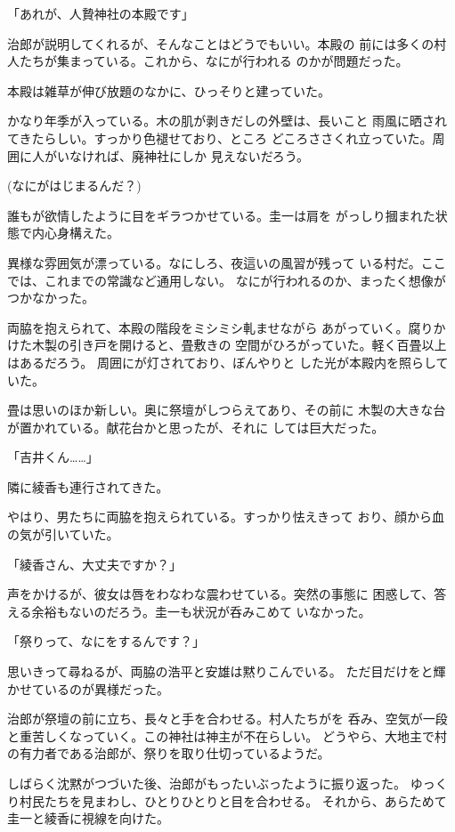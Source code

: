 ﻿\documentclass[
    book,tate,
    line_length=30zw,
    jafontsize=12pt,
    paper=b5j,
    landscape,
    ]{jlreq}
\begin{document}
「あれが、人贄神社の本殿です」

治郎が説明してくれるが、そんなことはどうでもいい。本殿の
前には多くの村人たちが集まっている。これから、なにが行われる
のかが問題だった。

本殿は雑草が伸び放題のなかに、ひっそりと建っていた。

かなり年季が入っている。木の肌が剥きだしの外壁は、長いこと
雨風に晒されてきたらしい。すっかり色褪せており、ところ
どころささくれ立っていた。周囲に人がいなければ、廃神社にしか
見えないだろう。

(なにがはじまるんだ？)

誰もが欲情したように目をギラつかせている。圭一は肩を
がっしり摑まれた状態で内心身構えた。

異様な雰囲気が漂っている。なにしろ、夜這いの風習が残って
いる村だ。ここでは、これまでの常識など通用しない。
なにが行われるのか、まったく想像がつかなかった。

両脇を抱えられて、本殿の階段をミシミシ軋ませながら
あがっていく。腐りかけた木製の引き戸を開けると、畳敷きの
空間がひろがっていた。軽く百畳以上はあるだろう。
周囲にが灯されており、ぼんやりと
した光が本殿内を照らしていた。

畳は思いのほか新しい。奥に祭壇がしつらえてあり、その前に
木製の大きな台が置かれている。献花台かと思ったが、それに
しては巨大だった。

「吉井くん……」

隣に綾香も連行されてきた。

やはり、男たちに両脇を抱えられている。すっかり怯えきって
おり、顔から血の気が引いていた。

「綾香さん、大丈夫ですか？」

声をかけるが、彼女は唇をわなわな震わせている。突然の事態に
困惑して、答える余裕もないのだろう。圭一も状況が呑みこめて
いなかった。

「祭りって、なにをするんです？」

思いきって尋ねるが、両脇の浩平と安雄は黙りこんでいる。
ただ目だけをと輝かせているのが異様だった。

治郎が祭壇の前に立ち、長々と手を合わせる。村人たちがを
呑み、空気が一段と重苦しくなっていく。この神社は神主が不在らしい。
どうやら、大地主で村の有力者である治郎が、祭りを取り仕切っているようだ。

しばらく沈黙がつづいた後、治郎がもったいぶったように振り返った。
ゆっくり村民たちを見まわし、ひとりひとりと目を合わせる。
それから、あらためて圭一と綾香に視線を向けた。
\end{document}
